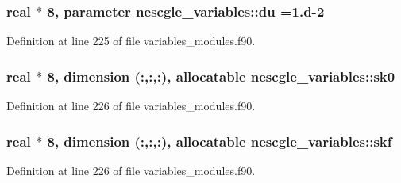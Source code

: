 \subsubsection[{\texorpdfstring{du}{du}}]{\setlength{\rightskip}{0pt plus 5cm}real $\ast$ 8, parameter nescgle\+\_\+variables\+::du =1.d-\/2}\hypertarget{namespacenescgle__variables_ab14faa799c9e46997e24517681585bc2}{}\label{namespacenescgle__variables_ab14faa799c9e46997e24517681585bc2}


Definition at line 225 of file variables\+\_\+modules.\+f90.

\subsubsection[{\texorpdfstring{sk0}{sk0}}]{\setlength{\rightskip}{0pt plus 5cm}real $\ast$ 8, dimension (\+:,\+:,\+:), allocatable nescgle\+\_\+variables\+::sk0}\hypertarget{namespacenescgle__variables_a048c355abe51e4b0aee3f618d9a67caf}{}\label{namespacenescgle__variables_a048c355abe51e4b0aee3f618d9a67caf}


Definition at line 226 of file variables\+\_\+modules.\+f90.

\subsubsection[{\texorpdfstring{skf}{skf}}]{\setlength{\rightskip}{0pt plus 5cm}real $\ast$ 8, dimension (\+:,\+:,\+:), allocatable nescgle\+\_\+variables\+::skf}\hypertarget{namespacenescgle__variables_af17f5ac212eaac0b60106deab33ab8af}{}\label{namespacenescgle__variables_af17f5ac212eaac0b60106deab33ab8af}


Definition at line 226 of file variables\+\_\+modules.\+f90.

